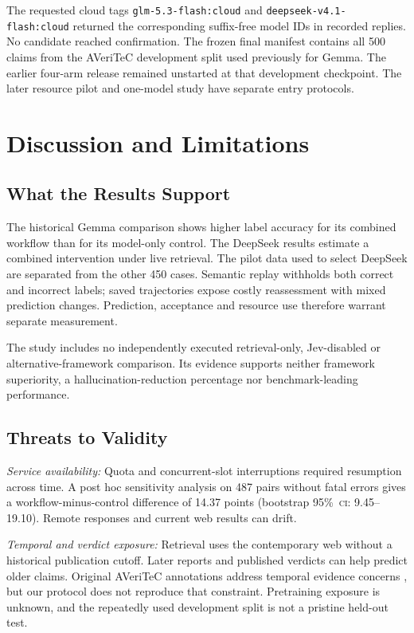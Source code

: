 \documentclass[conference]{IEEEtran}
\newcommand{\CI}{\textsc{ci}}
\newcommand{\pct}{\%}
\begin{document}
The requested cloud tags \texttt{glm-5.3-flash:cloud} and \texttt{deepseek-v4.1-flash:cloud} returned the corresponding suffix-free model IDs in recorded replies. No candidate reached confirmation. The frozen final manifest contains all 500 claims from the AVeriTeC development split used previously for Gemma. The earlier four-arm release remained unstarted at that development checkpoint. The later resource pilot and one-model study have separate entry protocols.

\section{Discussion and Limitations}
\subsection{What the Results Support}
The historical Gemma comparison shows higher label accuracy for its combined workflow than for its model-only control. The DeepSeek results estimate a combined intervention under live retrieval. The pilot data used to select DeepSeek are separated from the other 450 cases. Semantic replay withholds both correct and incorrect labels; saved trajectories expose costly reassessment with mixed prediction changes. Prediction, acceptance and resource use therefore warrant separate measurement.

The study includes no independently executed retrieval-only, Jev-disabled or alternative-framework comparison. Its evidence supports neither framework superiority, a hallucination-reduction percentage nor benchmark-leading performance.

\subsection{Threats to Validity}
\textit{Service availability:} Quota and concurrent-slot interruptions required resumption across time. A post hoc sensitivity analysis on 487 pairs without fatal errors gives a workflow-minus-control difference of 14.37 points (bootstrap 95\pct\ \CI: 9.45--19.10). Remote responses and current web results can drift.

\textit{Temporal and verdict exposure:} Retrieval uses the contemporary web without a historical publication cutoff. Later reports and published verdicts can help predict older claims. Original AVeriTeC annotations address temporal evidence concerns \cite{averitec}, but our protocol does not reproduce that constraint. Pretraining exposure is unknown, and the repeatedly used development split is not a pristine held-out test.
\end{document}
